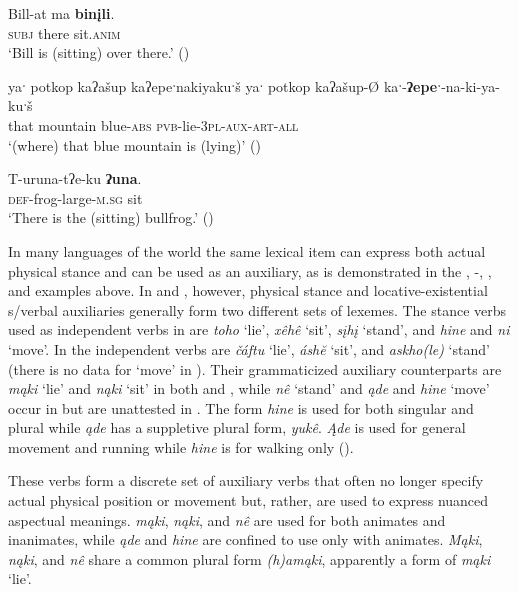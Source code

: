 \documentclass[output=paper]{LSP/langsci}
\begin{document}
\ea
\settowidth{}
\gll	Bill-at ma \textbf{binįli}.\\
	 \textsc{subj} there sit.\textsc{anim}\\ 
\glt `Bill is (sitting) over there.' (\citealt[21]{Watkins1976})
\z
		
\ea	
\settowidth{} 
yaˑ potkop kaʔašup kaʔepeˑnakiyakuˑš 
\gll		yaˑ potkop kaʔašup-Ø kaˑ-\textbf{ʔepeˑ}-na-ki-ya-kuˑš\\
		that mountain blue-\textsc{abs} \textsc{pvb}-lie-\textsc{3pl-aux-art-all}\\
\glt	`(where) that blue mountain is (lying)' (\citealt[438]{Kimball2005})
\z

\ea
\settowidth{}
\gll	T-uruna-tʔe-ku 	\textbf{ʔuna}.\\
 \textsc{def}-frog-large-\textsc{m.sg} sit\\ 
\glt `There is the (sitting) bullfrog.' (\citealt[26]{Watkins1976})
\z

In many languages of the world the same lexical item can express both actual physical stance and can be used as an auxiliary, as is demonstrated in the , -, , and  examples above. In  and , however, physical stance and locative-existential s/verbal auxiliaries generally form two different sets of lexemes. The stance verbs used as independent verbs in  are \emph{toho} `lie', \emph{xêhê} `sit', \emph{sįhį} `stand', and \emph{hine} and \emph{ni} `move'. In  the independent verbs are \emph{čáftu} `lie', \emph{áshĕ} `sit', and \emph{askho(le)} `stand' (there is no data for `move' in ). Their grammaticized auxiliary counterparts are \emph{mąki} `lie' and \emph{nąki} `sit' in both  and , while \emph{nê} `stand' and \emph{ąde} and \emph{hine} `move' occur in  but are unattested in . The  form \emph{hine} is used for both singular and plural while \emph{ąde} has a suppletive plural form, \emph{yukê}. \emph{Ąde} is used for general movement and running while \emph{hine} is for walking only (\citealt[3]{Kaufman2013}). 

These verbs form a discrete set of auxiliary verbs that often no longer specify actual physical position or movement but, rather, are used to express nuanced aspectual meanings.  \emph{mąki}, \emph{nąki}, and \emph{nê} are used for both animates and inanimates, while \emph{ąde} and \emph{hine} are confined to use only with animates. \emph{Mąki}, \emph{nąki}, and \emph{nê} share a common plural form \emph{(h)amąki}, apparently a form of \emph{mąki} `lie'. 
 
\end{document}
